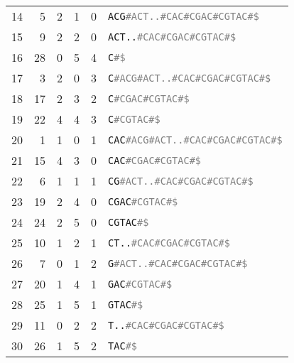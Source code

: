 \begin{table*}
\begin{tabular}{rrrrrl}
        14  &  5 &  2 & 1 & 0 & \texttt{ACG\textcolor{gray}{\#ACT..\#CAC\#CGAC\#CGTAC\#\$}}       \\
        15  &  9 &  2 & 2 & 0 & \texttt{ACT..\textcolor{gray}{\#CAC\#CGAC\#CGTAC\#\$}}            \\
        16  & 28 &  0 & 5 & 4 & \texttt{C\textcolor{gray}{\#\$}}                                  \\
        17  &  3 &  2 & 0 & 3 & \texttt{C\textcolor{gray}{\#ACG\#ACT..\#CAC\#CGAC\#CGTAC\#\$}}    \\
        18  & 17 &  2 & 3 & 2 & \texttt{C\textcolor{gray}{\#CGAC\#CGTAC\#\$}}                     \\
        19  & 22 &  4 & 4 & 3 & \texttt{C\textcolor{gray}{\#CGTAC\#\$}}                           \\
        20  &  1 &  1 & 0 & 1 & \texttt{CAC\textcolor{gray}{\#ACG\#ACT..\#CAC\#CGAC\#CGTAC\#\$}}  \\
        21  & 15 &  4 & 3 & 0 & \texttt{CAC\textcolor{gray}{\#CGAC\#CGTAC\#\$}}                   \\
        22  &  6 &  1 & 1 & 1 & \texttt{CG\textcolor{gray}{\#ACT..\#CAC\#CGAC\#CGTAC\#\$}}        \\
        23  & 19 &  2 & 4 & 0 & \texttt{CGAC\textcolor{gray}{\#CGTAC\#\$}}                        \\
        24  & 24 &  2 & 5 & 0 & \texttt{CGTAC\textcolor{gray}{\#\$}}                              \\
        25  & 10 &  1 & 2 & 1 & \texttt{CT..\textcolor{gray}{\#CAC\#CGAC\#CGTAC\#\$}}             \\
        26  &  7 &  0 & 1 & 2 & \texttt{G\textcolor{gray}{\#ACT..\#CAC\#CGAC\#CGTAC\#\$}}         \\
        27  & 20 &  1 & 4 & 1 & \texttt{GAC\textcolor{gray}{\#CGTAC\#\$}}                         \\
        28  & 25 &  1 & 5 & 1 & \texttt{GTAC\textcolor{gray}{\#\$}}                               \\
        29  & 11 &  0 & 2 & 2 & \texttt{T..\textcolor{gray}{\#CAC\#CGAC\#CGTAC\#\$}}              \\
        30  & 26 &  1 & 5 & 2 & \texttt{TAC\textcolor{gray}{\#\$}}                                \\
        \bottomrule
    \end{tabular}
\end{table*}


